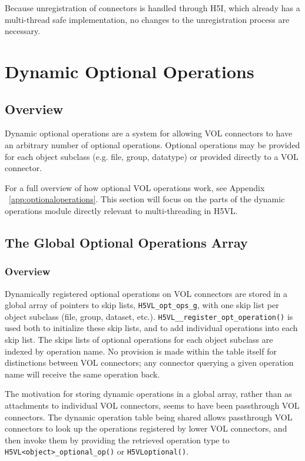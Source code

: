 \documentclass{article}
\begin{document}
Because unregistration of connectors is handled through H5I, which already has a multi-thread safe implementation, no changes to the unregistration process are necessary.


\section{Dynamic Optional Operations}

\subsection{Overview}
Dynamic optional operations are a system for allowing VOL connectors to have an arbitrary number of optional operations. Optional operations may be provided for each object subclass (e.g. file, group, datatype) or provided directly to a VOL connector. 

For a full overview of how optional VOL operations work, see Appendix ~\ref{app:optionaloperations}. This section will focus on the parts of the dynamic operations module directly relevant to multi-threading in H5VL.

\subsection{The Global Optional Operations Array}
\subsubsection{Overview}
Dynamically registered optional operations on VOL connectors are stored in a global array of pointers to skip lists, \texttt{H5VL\_opt\_ops\_g}, with one skip list per object subclass (file, group, dataset, etc.). \texttt{H5VL\_\_register\_opt\_operation()} is used both to initialize these skip lists, and to add individual operations into each skip list. The skips lists of optional operations for each object subclass are indexed by operation name. No provision is made within the table itself for distinctions between VOL connectors; any connector querying a given operation name will receive the same operation back. 

The motivation for storing dynamic operations in a global array, rather than as attachments to individual VOL connectors, seems to have been passthrough VOL connectors. The dynamic operation table being shared allows passthrough VOL connectors to look up the operations registered by lower VOL connectors, and then invoke them by providing the retrieved operation type to \texttt{H5VL<object>\_optional\_op()} or \texttt{H5VLoptional()}. 
\end{document}
